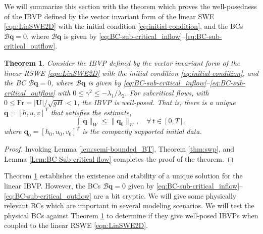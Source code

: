 \documentclass{article}
\numberwithin{equation}{section}
\newtheorem{theorem}{Theorem}
\theoremstyle{definition}
\begin{document}
\noindent
We will summarize this section with the theorem which proves the well-posedness of the IBVP defined by the vector invariant form of the linear SWE \eqref{eqn:LinSWE2D} with the initial condition \eqref{eq:initial-condition}, and the BCs  $\mathcal{B}\mathbf{q}=0$, where $\mathcal{B}\mathbf{q} $ is given by \eqref{eq:BC-sub-critical_inflow}--\eqref{eq:BC-sub-critical_outflow}.
\begin{theorem}\label{theo:well-posdeness-ibvp}
    Consider the IBVP defined by the vector invariant form of the linear RSWE \eqref{eqn:LinSWE2D} with the initial condition \eqref{eq:initial-condition}, and the BC  $\mathcal{B}\mathbf{q}=0$, where $\mathcal{B}\mathbf{q} $ is given by \eqref{eq:BC-sub-critical_inflow}--\eqref{eq:BC-sub-critical_outflow}
     with $0\le \gamma^2 \le -\lambda_1/\lambda_2$.  For subcritical flows, with $0\le\mathrm{Fr} = |\mathbf{U}|/\sqrt{gH} < 1$, the IBVP is well-posed.
     That is, there is a unique $\mathbf{q} = [h,u,v]^T$ that satisfies the estimate,
$$
\|\mathbf{q}\|_W \leq \|\mathbf{q}_0\|_W, \quad \forall \, t \in [0, T],
$$
     where $\mathbf{q}_0 = [h_0,u_0,v_0]^T$ is the compactly supported initial data.
\end{theorem}
\begin{proof}
Invoking Lemma \ref{lem:semi-bounded_BT}, Theorem \ref{thm:swp}, and Lemma \ref{Lem:BC-Sub-critical flow} completes the proof of the theorem.
    \end{proof}
Theorem \ref{theo:well-posdeness-ibvp} establishes the existence and stability of a unique solution for the linear IBVP. However, the BCs $\mathcal{B}\mathbf{q}=0$  given by \eqref{eq:BC-sub-critical_inflow}--\eqref{eq:BC-sub-critical_outflow} are a bit cryptic. We will give some physically relevant BCs which are important in several modeling scenarios. We will test the physical BCs against Theorem \ref{theo:well-posdeness-ibvp} to determine if they  give well-posed IBVPs when coupled to the linear RSWE \eqref{eqn:LinSWE2D}.
\end{document}
